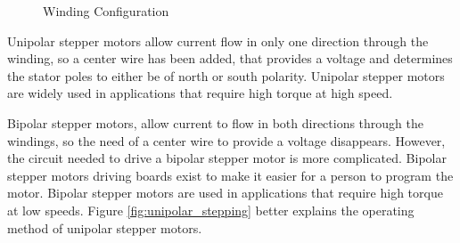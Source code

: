 \begin{figure}[htp] 
    \centering
    \hfill
    \caption{Winding Configuration}
    \label{fig:windings}
\end{figure}

Unipolar stepper motors allow current flow in only one direction through the winding, so a center wire has been added, that provides a voltage and determines the stator poles to either be of north or south polarity. Unipolar stepper motors are widely used in applications that require high torque at high speed.

Bipolar stepper motors, allow current to flow in both directions through the windings, so the need of a center wire to provide a voltage disappears. However, the circuit needed to drive a bipolar stepper motor is more complicated. Bipolar stepper motors driving boards exist to make it easier for a person to program the motor. Bipolar stepper motors are used in applications that require high torque at low speeds.
\newpage
Figure \ref{fig:unipolar_stepping} better explains the operating method of unipolar stepper motors. 


